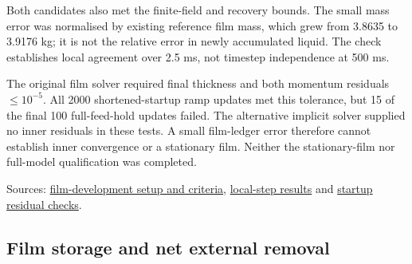 \documentclass[12pt]{article}
\begin{document}
Both candidates also met the finite-field and recovery bounds. The small mass error was normalised by existing reference film mass, which grew from 3.8635 to 3.9176 kg; it is not the relative error in newly accumulated liquid. The check establishes local agreement over 2.5 ms, not timestep independence at 500 ms.

The original film solver required final thickness and both momentum residuals \(\leq10^{-5}\). All 2000 shortened-startup ramp updates met this tolerance, but 15 of the final 100 full-feed-hold updates failed. The alternative implicit solver supplied no inner residuals in these tests. A small film-ledger error therefore cannot establish inner convergence or a stationary film. Neither the stationary-film nor full-model qualification was completed.

Sources: \href{draft/../../../experiments/phase-07-2a-wall-liquid-routing/stage-03-shortened-reconstruction/early-ewf-startup/film-development/setup.md}{film-development setup and criteria}, \href{draft/../../../experiments/phase-07-2a-wall-liquid-routing/stage-03-shortened-reconstruction/early-ewf-startup/film-development/results.md}{local-step results} and \href{draft/../../../experiments/phase-07-2a-wall-liquid-routing/stage-03-shortened-reconstruction/early-ewf-startup/results.md}{startup residual checks}.

\subsection{Film storage and net external removal}\label{a.5.-film-storage-and-net-external-removal}
\end{document}
